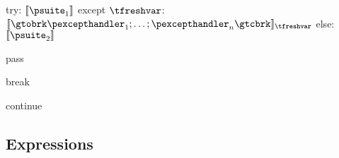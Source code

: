\documentclass{article}
\begin{document}
\newsavebox{\tryBox}
\begin{lrbox}{\tryBox}
\begin{python}
try:
  $\meaningof{\psuite_1}$
except $\tfreshvar$:
  $\meaningof{\gtobrk \pexcepthandler_1; \ldots; \pexcepthandler_n \gtcbrk}_{\tfreshvar}$
else:
  $\meaningof{\psuite_2}$
\end{python}
\end{lrbox}

\begin{mathpar}
\end{mathpar}

\newsavebox{\passBox}
\begin{lrbox}{\passBox}
\begin{python}
pass
\end{python}
\end{lrbox}

\begin{mathpar}
\end{mathpar}

\newsavebox{\breakBox}
\begin{lrbox}{\breakBox}
\begin{python}
break
\end{python}
\end{lrbox}

\begin{mathpar}
\end{mathpar}

\newsavebox{\continueBox}
\begin{lrbox}{\continueBox}
\begin{python}
continue
\end{python}
\end{lrbox}

\begin{mathpar}
\end{mathpar}

\subsection{Expressions}
\end{document}
